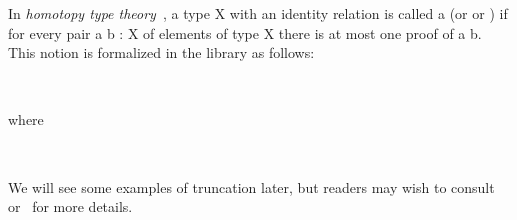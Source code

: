 \documentclass[a4paper,UKenglish,cleveref,autoref,thm-restate]{lipics-v2021}
\begin{document}
In \emph{homotopy type theory}~\cite{HoTT:2013}, a type \ab X with an identity relation  is called a  (or  or ) if for every pair \ab a \ab b \as : \ab X of elements of type \ab X there is at most one proof of \ab a  \ab b. This notion is formalized in the \TypeTopology library as follows:
\ccpad
\begin{code}[number=code:is-set]
\>[0]\AgdaSpace{}%
\AgdaSymbol{:}\AgdaSpace{}%
\AgdaSpace{}%
\AgdaSpace{}%
\AgdaSpace{}%
\AgdaSpace{}%
\<%
\\
\>[0]\AgdaSpace{}%
\AgdaSpace{}%
\AgdaSymbol{=}\AgdaSpace{}%
\AgdaSymbol{(}\AgdaSpace{}%
\AgdaSpace{}%
\AgdaSymbol{:}\AgdaSpace{}%
\AgdaSymbol{)}\AgdaSpace{}%
\AgdaSpace{}%
\AgdaSpace{}%
\AgdaSymbol{(}\AgdaSpace{}%
\AgdaSpace{}%
\AgdaSymbol{)}\<%
\end{code}
\ccpad
where
\ccpad
\begin{code}[number=code:is-subsingleton]
\>[0]\AgdaSpace{}%
\AgdaSymbol{:}\AgdaSpace{}%
\AgdaSpace{}%
\AgdaSpace{}%
\AgdaSpace{}%
\AgdaSpace{}%
\<%
\\
\>[0]\AgdaSpace{}%
\AgdaSpace{}%
\AgdaSymbol{=}\AgdaSpace{}%
\AgdaSymbol{(}\AgdaSpace{}%
\AgdaSpace{}%
\AgdaSymbol{:}\AgdaSpace{}%
\AgdaSymbol{)}\AgdaSpace{}%
\AgdaSpace{}%
\AgdaSpace{}%
\AgdaSpace{}%
\<%
\end{code}
\ccpad
We will see some examples of truncation later, but readers may wish to consult~\cite[\S34-35]{MHE} or~\cite[\S7.1]{HoTT:2013} for more details.
\end{document}

